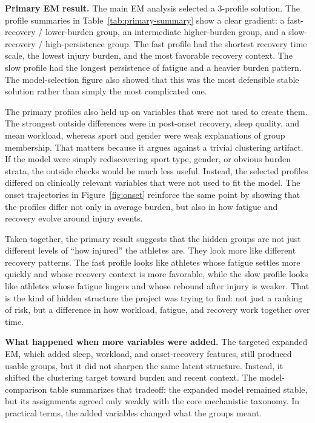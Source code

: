 \documentclass[11pt]{article}
\begin{document}
\textbf{Primary EM result.}
The main EM analysis selected a 3-profile solution. The profile summaries in Table~\ref{tab:primary-summary} show a clear gradient: a fast-recovery / lower-burden group, an intermediate higher-burden group, and a slow-recovery / high-persistence group. The fast profile had the shortest recovery time scale, the lowest injury burden, and the most favorable recovery context. The slow profile had the longest persistence of fatigue and a heavier burden pattern. The model-selection figure also showed that this was the most defensible stable solution rather than simply the most complicated one.

The primary profiles also held up on variables that were not used to create them. The strongest outside differences were in post-onset recovery, sleep quality, and mean workload, whereas sport and gender were weak explanations of group membership. That matters because it argues against a trivial clustering artifact. If the model were simply rediscovering sport type, gender, or obvious burden strata, the outside checks would be much less useful. Instead, the selected profiles differed on clinically relevant variables that were not used to fit the model. The onset trajectories in Figure~\ref{fig:onset} reinforce the same point by showing that the profiles differ not only in average burden, but also in how fatigue and recovery evolve around injury events.

Taken together, the primary result suggests that the hidden groups are not just different levels of ``how injured'' the athletes are. They look more like different recovery patterns. The fast profile looks like athletes whose fatigue settles more quickly and whose recovery context is more favorable, while the slow profile looks like athletes whose fatigue lingers and whose rebound after injury is weaker. That is the kind of hidden structure the project was trying to find: not just a ranking of risk, but a difference in how workload, fatigue, and recovery work together over time.

\textbf{What happened when more variables were added.}
The targeted expanded EM, which added sleep, workload, and onset-recovery features, still produced usable groups, but it did not sharpen the same latent structure. Instead, it shifted the clustering target toward burden and recent context. The model-comparison table summarizes that tradeoff: the expanded model remained stable, but its assignments agreed only weakly with the core mechanistic taxonomy. In practical terms, the added variables changed what the groups meant.
\end{document}
